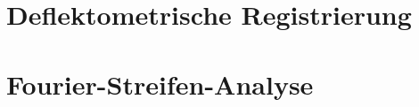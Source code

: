 \documentclass[ngerman,11pt,a4paper]{report}
\begin{document}
	{
		\FloatBarrier %
		\chapter{Deflektometrische Registrierung}
		
	}
	
	{
		\FloatBarrier %
		\chapter{Fourier-Streifen-Analyse}
		
	}
	
	{
		\FloatBarrier %
		\newpage
		\printbibliography[title = Quellenverzeichnis]
	}
\end{document}
